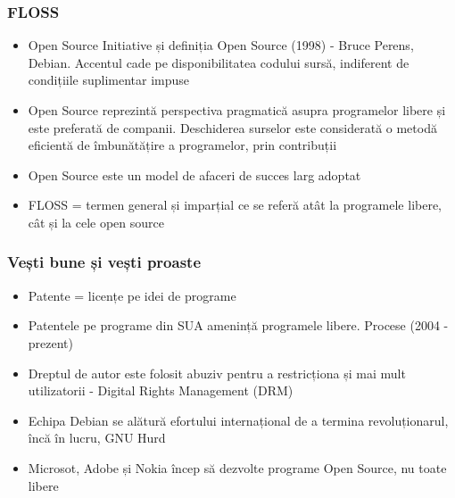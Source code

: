 \documentclass{beamer}
\begin{document}
\begin{frame}[allowframebreaks] %
\frametitle{FLOSS}
\begin{itemize}
\item Open Source Initiative și definiția Open Source (1998) - Bruce Perens,
Debian. Accentul cade pe disponibilitatea codului sursă, indiferent de condițiile 
suplimentar impuse
\item Open Source reprezintă perspectiva pragmatică asupra programelor libere
și este preferată de companii. Deschiderea surselor este considerată o
metodă eficientă de îmbunătățire a programelor, prin contribuții 
\item Open Source este un model de afaceri de succes larg adoptat
\item FLOSS = termen general și imparțial ce se referă atât la programele libere, 
cât și la cele open source
\end{itemize}
\end{frame}

\begin{frame}[allowframebreaks] %
\frametitle{Vești bune și vești proaste}
\begin{itemize}
\item Patente = licențe pe idei de programe
\item Patentele pe programe din SUA amenință programele libere. Procese (2004
- prezent)
\item Dreptul de autor este folosit abuziv pentru a restricționa și mai mult
utilizatorii - Digital Rights Management (DRM)
\item Echipa Debian se alătură efortului internațional de a termina
revoluționarul, încă în lucru, GNU Hurd
\item Microsot, Adobe și Nokia încep să dezvolte programe Open Source, nu
toate libere
\end{itemize}
\end{frame}
\end{document}
